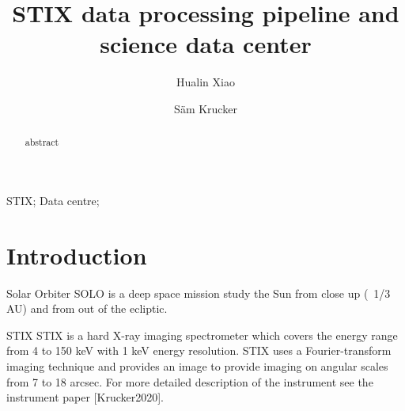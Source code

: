 \documentclass[preprint,11pt]{elsarticle}
\begin{document}
\begin{frontmatter}

\title{STIX data processing pipeline and science data center}
\author[fhnw]{Hualin Xiao}

\author[fhnw]{S{\"a}m Krucker}


\address[fhnw]{University of Applied Sciences and Arts Northwestern Switzerland (FHNW), 5200 Windisch, Switzerland}
\begin{abstract}
 abstract
\end{abstract}

 

\begin{keyword}
STIX; Data centre;
\end{keyword}
\end{frontmatter}

\section{Introduction}
Solar Orbiter
SOLO is a deep space mission study the Sun from close up (~1/3 AU) and from out of the ecliptic.

STIX
STIX is a hard X-ray imaging spectrometer which covers the energy range from 4 to 150 keV with 1 keV energy resolution. STIX uses a Fourier-transform imaging technique and provides an image to provide imaging on angular scales from 7 to 18 arcsec. For more detailed description of the instrument see the instrument paper [Krucker2020].
\end{document}
